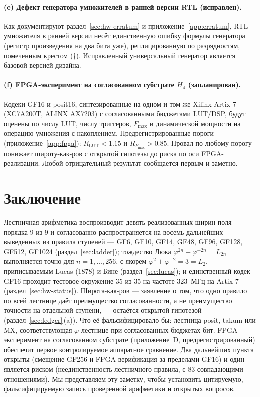 \documentclass[11pt,a4paper]{article}
\theoremstyle{plain}
\begin{document}
\paragraph{(e) Дефект генератора умножителей в ранней версии RTL (исправлен).}
Как документируют раздел~\ref{sec:hw-erratum} и приложение~\ref{app:erratum},
RTL умножителя в ранней версии несёт единственную
ошибку формулы генератора (регистр произведения на два бита уже),
реплицированную по разрядностям, помеченным крестом (\(\dagger\)).
Исправленный универсальный генератор является базовой версией дизайна.

\paragraph{(f) FPGA-эксперимент на согласованном субстрате $H_4$ (запланирован).}
Кодеки GF16 и posit16, синтезированные на одном и том же Xilinx Artix-7
(XC7A200T, ALINX AX7203) с согласованными бюджетами LUT/DSP, будут оценены
по числу LUT, числу триггеров, \(F_{\max}\) и динамической мощности на операцию
умножения с накоплением. Предрегистрированные пороги
(приложение~\ref{app:fpga}): \(R_{\mathrm{LUT}} < 1.15\) и
\(R_{F_{\max}} > 0.85\). Провал по любому порогу понижает широту-как-ров с
открытой гипотезы до риска по оси FPGA-реализации. Любой отрицательный результат
сообщается первым и заметно.

\section{Заключение}\label{sec:conclusion}

Лестничная арифметика воспроизводит девять реализованных ширин поля порядка
9 из 9 и согласованно распространяется на восемь дальнейших выведенных из
правила ступеней --- GF6, GF10, GF14, GF48, GF96, GF128, GF512, GF1024
(раздел~\ref{sec:ladder}); тождество Люка
\(\varphi^{2n} + \varphi^{-2n} = L_{2n}\) выполняется точно для
\(n = 1,\dots,256\), с якорем \(\varphi^{2} + \varphi^{-2} = 3 = L_{2}\),
приписываемым Lucas (1878) и Бине (раздел~\ref{sec:lucas}); и единственный кодек
GF16 проходит тестовое окружение 35 из 35 на частоте 323~МГц на Artix-7
(раздел~\ref{sec:hw-status}). Широта-как-ров --- заявление о том, что одно
правило по всей лестнице даёт преимущество согласованности, а не преимущество
точности на отдельной ступени, --- остаётся открытой гипотезой
(раздел~\ref{sec:ledger}\,(a)). Что её фальсифицировало бы: лестница posit,
takum или MX, соответствующая \(\varphi\)-лестнице при согласованных бюджетах
бит. FPGA-эксперимент на согласованном субстрате (приложение~D,
предрегистрированный) обеспечит первое контролируемое аппаратное сравнение. Два
дальнейших пункта открыты (смещение GF256 и FPGA-верификация за пределами GF16) и один
является риском (неединственность лестничного правила, с 83 совпадающими
отношениями). Мы представляем эту заметку, чтобы установить цитируемую,
фальсифицируемую запись проверенной арифметики и открытых вопросов.
\end{document}
